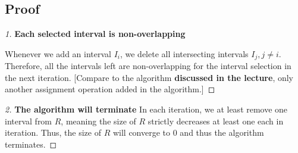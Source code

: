 \documentclass[openany]{article}
\begin{document}
\subsection*{Proof}


\begin{proof}[1] \textbf{Each selected interval is non-overlapping}

    Whenever we add an interval $I_i$, we delete all intersecting intervals $I_j, j\neq i$. Therefore, all the intervals left are non-overlapping for the interval selection in the next iteration. [Compare to the algorithm \textbf{discussed in the lecture}, only another assignment operation added in the algorithm.]
\end{proof}

\begin{proof}[2] \textbf{The algorithm will terminate}
    In each iteration, we at least remove one interval from $R$, meaning the size of $R$ strictly decreases at least one each in iteration. Thus, the size of $R$ will converge to 0 and thus the algorithm terminates.
\end{proof}
\end{document}
